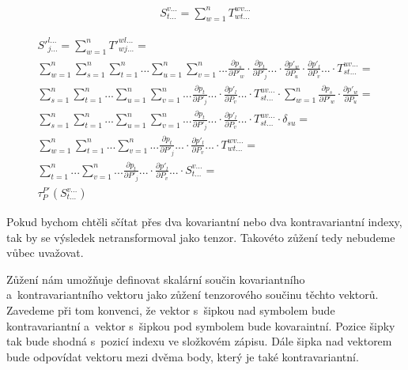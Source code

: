 \begin{equation}
\begin{split}
S_{t...}^{v...} = \sum_{w=1}^n T_{wt...}^{wv...}
\end{split}
\end{equation}

\begin{equation}
\begin{split}
S'^{l...}_{j...} = \sum_{w=1}^n T'^{wl...}_{wj...} = \\
\sum_{w=1}^n \sum_{s=1}^n \sum_{t=1}^n ... \sum_{u=1}^n \sum_{v=1}^n ... \frac{\partial p_s}{\partial P'_w} \cdot \frac{\partial p_t}{\partial P'_j} ... \cdot \frac{\partial p'_w}{\partial P_u} \cdot \frac{\partial p'_l}{\partial P_v} ... \cdot T_{st...}^{uv...} = \\
\sum_{s=1}^n \sum_{t=1}^n ... \sum_{u=1}^n \sum_{v=1}^n ... \frac{\partial p_t}{\partial P'_j} ... \cdot \frac{\partial p'_l}{\partial P_v} ... \cdot T_{st...}^{uv...} \cdot \sum_{w=1}^n \frac{\partial p_s}{\partial P'_w} \cdot \frac{\partial p'_w}{\partial P_u} = \\
\sum_{s=1}^n \sum_{t=1}^n ... \sum_{u=1}^n \sum_{v=1}^n ... \frac{\partial p_t}{\partial P'_j} ... \cdot \frac{\partial p'_l}{\partial P_v} ... \cdot T_{st...}^{uv...} \cdot \delta_{su} = \\
\sum_{w=1}^n \sum_{t=1}^n ... \sum_{v=1}^n ... \frac{\partial p_t}{\partial P'_j} ... \cdot \frac{\partial p'_l}{\partial P_v} ... \cdot T_{wt...}^{wv...} = \\
\sum_{t=1}^n ... \sum_{v=1}^n ... \frac{\partial p_t}{\partial P'_j} ... \cdot \frac{\partial p'_l}{\partial P_v} ... \cdot S_{t...}^{v...} = \\
\tau_P^{P'} (S_{t...}^{v...})
\end{split}
\end{equation}

Pokud bychom chtěli sčítat přes dva kovariantní nebo dva kontravariantní indexy, tak by se výsledek netransformoval jako tenzor. Takovéto zůžení tedy nebudeme
vůbec uvažovat.

Zůžení nám umožňuje definovat skalární součin kovariantního a~kontravariantního vektoru jako zůžení tenzorového součinu těchto vektorů. Zavedeme při tom
konvenci, že vektor s~šipkou nad symbolem bude kontravariantní a~vektor s~šipkou pod symbolem bude kovaraintní. Pozice šipky tak bude shodná s~pozicí
indexu ve složkovém zápisu. Dále šipka nad vektorem bude odpovídat vektoru mezi dvěma body, který je také kontravariantní.

